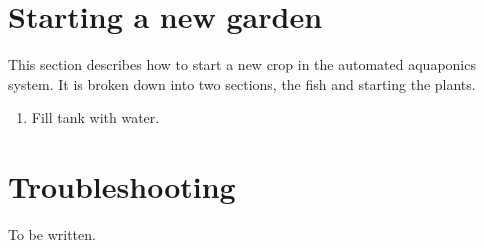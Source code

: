 \documentclass[american,man,12pt]{apa6}
\begin{document}
\section{Starting a new garden}
This section describes how to start a new crop in the automated aquaponics
system. It is broken down into two sections, the fish and starting the plants.

\begin{enumerate}
	\item Fill tank with water.
\end{enumerate}



\section{Troubleshooting}
To be written.


\printbibliography
\end{document}
